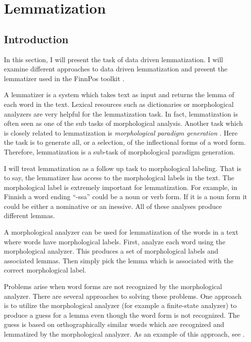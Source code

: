 \chapter{Lemmatization}
\section{Introduction}

In this section, I will present the task of data driven
lemmatization. I will examine different approaches to data driven
lemmatization and present the lemmatizer used in the FinnPos toolkit
\cite{Silfverberg2015}.

A lemmatizer is a system which takes text as input and returns the
lemma of each word in the text. Lexical resources such as dictionaries
or morphological analyzers are very helpful for the lemmatization
task. In fact, lemmatization is often seen as one of the sub tasks of
morphological analysis. Another task which is closely related to
lemmatization is {\it morphological paradigm generation}
\citep{Eisnerfoo,Hulden2009}. Here the task is to generate all, or a
selection, of the inflectional forms of a word form. Therefore,
lemmatization is a sub-task of morphological paradigm generation.

I will treat lemmatization as a follow up task to morphological
labeling. That is to say, the lemmatizer has access to the
morphological labels in the text. The morphological label is extremely
important for lemmatization. For example, in Finnish a word ending
``-ssa'' could be a noun or verb form. If it is a noun form it could
be either a nominative or an inessive. All of these analyses produce
different lemmas.

A morphological analyzer can be used for lemmatization of the words in
a text where words have morphological labels. First, analyze each word
using the morphological analyzer. This produces a set of morphological
labels and associated lemmas. Then simply pick the lemma which is
associated with the correct morphological label.

Problems arise when word forms are not recognized by the morphological
analyzer. There are several approaches to solving these problems. One
approach is to utilize the morphological analyzer (for example a
finite-state analyzer) to produce a guess for a lemma even though the
word form is not recognized. The guess is based on orthographically
similar words which are recognized and lemmatized by the morphological
analyzer. As an example of this approach, see \cite{Linden2009}.

